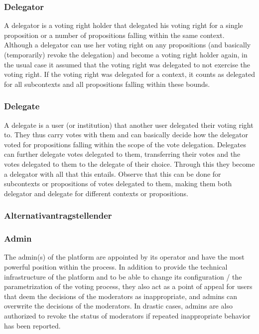 \subsubsection{Delegator}
\label{ssec:Roles_Delegator}
A delegator is a voting right holder that delegated his voting right for a single proposition or a number of propositions falling within the same context. Although a delegator can use her voting right on any propositions (and basically (temporarily) revoke the delegation) and become a voting right holder again, in the usual case it assumed that the voting right was delegated to not exercise the voting right. If the voting right was delegated for a context, it counts as delegated for all subcontexts and all propositions falling within these bounds.  

\subsubsection{Delegate}
\label{ssec:Roles_Delegate}
A delegate is a user (or institution) that another user delegated their voting right to. They thus carry votes with them and can basically decide how the delegator voted for propositions falling within the scope of the vote delegation. Delegates can further delegate votes delegated to them, transferring their votes and the votes delegated to them to the delegate of their choice. Through this they become a delegator with all that this entails. Observe that this can be done for subcontexts or propositions of votes delegated to them, making them both delegator and delegate for different contexts or propositions.

\subsubsection{Alternativantragstellender}
%
%
\label{ssec:Roles_Alternativantragstellender}

\subsubsection{Admin}
\label{ssec:Roles_Admin}
The admin(s) of the platform are appointed by its operator and have the most powerful position within the process. In addition to provide the technical infrastructure of the platform and to be able to change its configuration / the parametrization of the voting process, they also act as a point of appeal for users that deem the decisions of the moderators as inappropriate, and admins can overwrite the decisions of the moderators. In drastic cases, admins are also authorized to revoke the status of moderators if repeated inappropriate behavior has been reported. 

